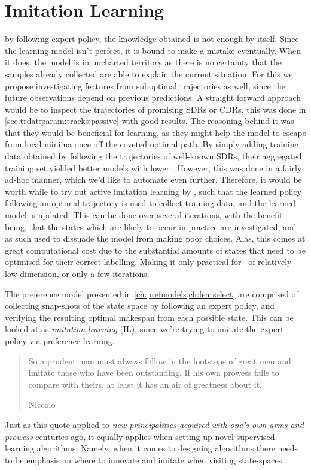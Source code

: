 \chapter{Imitation Learning}\label{ch:imitation}

 by following 
expert policy, the knowledge obtained is not enough by itself. Since the 
learning model isn't perfect, it is bound to make a mistake eventually. 
When it does, the model is in uncharted  territory as there is no certainty that
the samples already collected are able to explain the current situation. 
For this we propose investigating features from suboptimal trajectories as 
well, since the future observations depend on previous predictions. 
A straight forward approach would be to inspect the trajectories of promising 
SDRs or CDRs, this was done in \cref{sec:trdat:param:tracks:passive} with good 
results. 
The reasoning behind it was that they would be beneficial for learning, 
as they might help the model to escape from local minima once off the coveted 
optimal path. 
By simply adding training data obtained by following the trajectories of 
well-known SDRs, their aggregated training set yielded better models with lower 
\namerho.
However, this was done in a fairly ad-hoc manner, which we'd like to automate 
even further.  
Therefore, it would be worth while to try out active imitation learning by 
\cite{RossB10,RossGB11}, such that the learned policy following an optimal 
trajectory is used to collect training data, and the learned model is updated. 
This can be done over several iterations, with the benefit being, that the 
states which are likely to occur in practice are investigated, and as such used 
to dissuade the model from making poor choices. 
Alas, this comes at great computational cost due to the substantial amounts of 
states that need to be optimised for their correct labelling. 
Making it only practical for \jsp\ of relatively low dimension, or only a few 
iterations. 

The preference model presented in \cref{ch:prefmodels,ch:featselect} are 
comprised of collecting snap-shots of the state space by following an expert 
policy, and verifying the resulting optimal makespan from each possible state. 
This can be looked at as \emph{imitation learning} (IL), since we're trying to 
imitate the expert policy via preference learning. 

\begin{quote}
    So a prudent man must always follow in the footsteps of great men and 
    imitate those who have been outstanding. If his own prowess fails to 
    compare with theirs, at least it has an air of greatness about it. 
    
    \raggedleft Niccolò \cite{Maachiavelli}
\end{quote}
Just as this quote applied to \emph{new principalities acquired with one's own 
arms and prowess} centuries ago, it equally applies when setting up novel 
supervised learning algorithms. 
Namely, when it comes to designing algorithms there needs to be emphasis on 
where to innovate and imitate when visiting state-spaces. 

